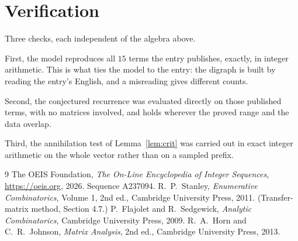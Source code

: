 \documentclass[11pt,a4paper]{article}
\theoremstyle{plain}
\theoremstyle{definition}
\begin{document}
\section{Verification}

Three checks, each independent of the algebra above.

First, the model reproduces all $15$ terms the entry publishes, exactly, in integer
arithmetic. This is what ties the model to the entry: the digraph is built by reading the
entry's English, and a misreading gives different counts.

Second, the conjectured recurrence was evaluated directly on those published terms, with no
matrices involved, and holds wherever the proved range and the data overlap.

Third, the annihilation test of Lemma~\ref{lem:crit} was carried out in exact integer
arithmetic on the whole vector rather than on a sampled prefix.

\begin{thebibliography}{9}
 The OEIS Foundation, \emph{The On-Line Encyclopedia of Integer
Sequences}, \url{https://oeis.org}, 2026. Sequence A237094.
 R.~P.~Stanley, \emph{Enumerative Combinatorics}, Volume 1, 2nd ed.,
Cambridge University Press, 2011. (Transfer-matrix method, Section 4.7.)
 P.~Flajolet and R.~Sedgewick, \emph{Analytic Combinatorics}, Cambridge
University Press, 2009.
 R.~A.~Horn and C.~R.~Johnson, \emph{Matrix Analysis}, 2nd ed., Cambridge
University Press, 2013.
\end{thebibliography}
\end{document}
